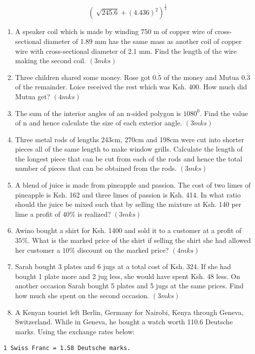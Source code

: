 \documentclass[
  a4paperpaper,
]{scrbook}
\begin{document}
\begin{tcolorbox}
\[\left(\sqrt[]{245.6}+(4.436)^2\right)^\frac{1}{2}\]

\begin{enumerate}
\def\labelenumi{\arabic{enumi}.}
\setcounter{enumi}{6}
\item
  A speaker coil which is made by winding 750 m of copper wire of
  cross-sectional diameter of 1.89 mm has the same mass as another coil
  of copper wire with cross-sectional diameter of 2.1 mm. Find the
  length of the wire making the second coil. \((3mks)\)
\item
  Three children shared some money. Rose got \(0.\dot{5}\) of the money
  and Mutua \(0.\dot3\) of the remainder. Loice received the rest which
  was Ksh. 400. How much did Mutua get? \((4mks)\)
\item
  The sum of the interior angles of an n-sided polygon is \(1080^0\).
  Find the value of n and hence calculate the size of each exterior
  angle. \((3mks)\)
\item
  Three metal rods of lengths 243cm, 270cm and 198cm were cut into
  shorter pieces all of the same length to make window grills. Calculate
  the length of the longest piece that can be cut from each of the rods
  and hence the total number of pieces that can be obtained from the
  rods. \((3mks)\)
\item
  A blend of juice is made from pineapple and passion. The cost of two
  limes of pineapple is Ksh. 162 and three limes of passion is Ksh. 414.
  In what ratio should the juice be mixed such that by selling the
  mixture at Ksh. 140 per lime a profit of \(40\%\) is realized?
  \((3mks)\)
\item
  Awino bought a shirt for Ksh. 1400 and sold it to a customer at a
  profit of \(35\%\). What is the marked price of the shirt if selling
  the shirt she had allowed her customer a \(10\%\) discount on the
  marked price? \((4mks)\)
\item
  Sarah bought 3 plates and 6 jugs at a total cost of Ksh. 324. If she
  had bought 1 plate more and 2 jug less, she would have spent Ksh. 48
  less. On another occasion Sarah bought 5 plates and 5 jugs at the same
  prices. Find how much she spent on the second occasion. \((3mks)\)
\item
  A Kenyan tourist left Berlin, Germany for Nairobi, Kenya through
  Geneva, Switzerland. While in Geneva, he bought a watch worth 110.6
  Deutsche marks. Using the exchange rates below:
\end{enumerate}

\begin{verbatim}
1 Swiss Franc = 1.58 Deutsche marks.


\end{verbatim}
\end{tcolorbox}
\end{document}
